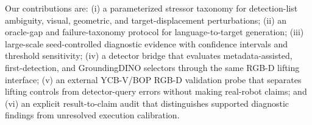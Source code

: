 Our contributions are: (i) a parameterized stressor taxonomy for detection-list ambiguity, visual, geometric, and target-displacement perturbations; (ii) an oracle-gap and failure-taxonomy protocol for language-to-target generation; (iii) large-scale seed-controlled diagnostic evidence with confidence intervals and threshold sensitivity; (iv) a detector bridge that evaluates metadata-assisted, first-detection, and GroundingDINO selectors through the same RGB-D lifting interface; (v) an external YCB-V/BOP RGB-D validation probe that separates lifting controls from detector-query errors without making real-robot claims; and (vi) an explicit result-to-claim audit that distinguishes supported diagnostic findings from unresolved execution calibration.
